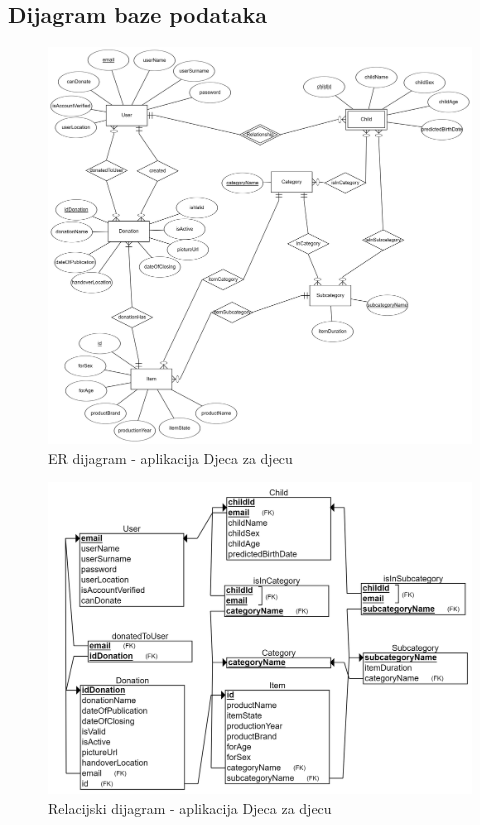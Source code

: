 			\subsection{Dijagram baze podataka}
				\begin{figure}[H]
					\includegraphics[width=\textwidth,height=0.7\textheight]{dijagrami/ERdijagram.png}
					\centering
					\caption{ER dijagram - aplikacija Djeca za djecu}
					\label{fig:ERDiagram}
				\end{figure}

				\begin{figure}[H]
					\includegraphics[width=\textwidth,height=0.7\textheight]{dijagrami/RelDijagram.png}
					\centering
					\caption{Relacijski dijagram - aplikacija Djeca za djecu}
					\label{fig:RelDijagram}
				\end{figure}
			\eject
			
